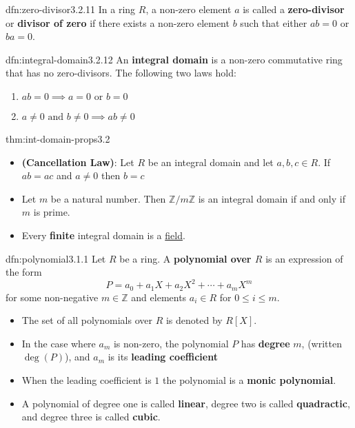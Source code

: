 \documentclass[landscape, 8pt]{extarticle}
\begin{document}
\begin{multicols}{3}
\begin{dfn}{dfn:zero-divisor}{3.2.11}
    In a ring $R$, a non-zero element $a$ is called a \textbf{zero-divisor} or \textbf{divisor of zero} if there exists a non-zero element $b$ such that either $ab = 0$ or $ba = 0$.
\end{dfn}

\begin{dfn}{dfn:integral-domain}{3.2.12}
    An \textbf{integral domain} is a non-zero commutative ring that has no zero-divisors. The following two laws hold:
    \begin{enumerate}
        \setlength\itemsep{0em}
        \item $ab = 0 \implies a = 0 \text{ or } b = 0$
        \item $a \ne 0 \text{ and } b \ne 0 \implies ab \ne 0$
    \end{enumerate}
\end{dfn}


\begin{thm}{thm:int-domain-props}{3.2}
    \begin{itemize}
        \setlength\itemsep{0em}
        \item[\textbf{3.2.15}] \textbf{(Cancellation Law)}: Let $R$ be an integral domain and let $a,b,c\in R$. If $ab = ac$ and $a\ne 0$ then $b = c$
        \item[\textbf{3.2.16}] Let $m$ be a natural number. Then $\mathbb{Z} / m\mathbb{Z}$ is an integral domain if and only if $m$ is prime.
        \item[\textbf{3.2.17}] Every \textbf{finite} integral domain is a \hyperref[dfn:field]{field}.
    \end{itemize}
    
    
\end{thm}

\begin{dfn}[Polynomial]{dfn:polynomial}{3.1.1}
    Let $R$ be a ring. A \textbf{polynomial over $R$} is an expression of the form
    \[P = a_{0} + a_{1}X + a_{2}X^{2} + \cdots + a_{m}X^{m}\]
    for some non-negative $m\in \mathbb{Z}$ and elements $a_{i}\in R$ for $0 \le i \le m$. 

    \vspace{-5pt}
    \begin{itemize}[leftmargin=*]
        \setlength\itemsep{0em}
        \item The set of all polynomials over $R$ is denoted by $R[X]$.
        \item In the case where $a_{m}$ is non-zero, the polynomial $P$ has \textbf{degree} $m$, (written $\deg(P)$), and $a_{m}$ is its \textbf{leading coefficient}
        \item When the leading coefficient is $1$ the polynomial is a \textbf{monic polynomial}.
        \item A polynomial of degree one is called \textbf{linear}, degree two is called \textbf{quadractic}, and degree three is called \textbf{cubic}.
    \end{itemize}
\end{dfn}


\end{multicols}
\end{document}
